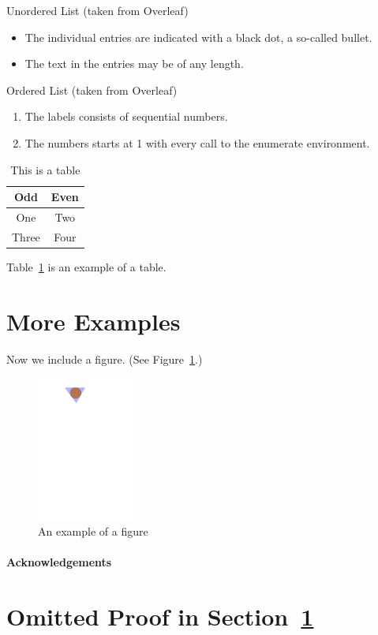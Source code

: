 \documentclass[a4paper]{article}
\theoremstyle{plain}
\theoremstyle{definition}
\begin{document}
Unordered List (taken from Overleaf)
\begin{itemize}
	\item The individual entries are indicated with a black dot, a so-called bullet.
	\item The text in the entries may be of any length.
\end{itemize}

Ordered List (taken from Overleaf)
\begin{enumerate}
	\item The labels consists of sequential numbers.
	\item The numbers starts at 1 with every call to the enumerate environment.
\end{enumerate}

\begin{table}[ht]
	\centering
	\begin{tabular}{|c|c|}
		\hline
		\textbf{Odd} & \textbf{Even} \\
		\hline\hline
		One          & Two           \\
		\hline
		Three        & Four          \\
		\hline
	\end{tabular}
	\caption{This is a table}
	\label{tbl:1}
\end{table}

Table~\ref*{tbl:1} is an example of a table.

\section{More Examples}
\label{sec:examples}

Now we include a figure.
(See Figure~\ref{fig:example}.)
\begin{figure}[ht]
	\centering
	\includegraphics[width=0.3\textwidth]{example}
	\caption{An example of a figure}
	\label{fig:example}
\end{figure}

\paragraph{Acknowledgements} \lipsum[6]


\nocite{*}

\appendix

\section{Omitted Proof in Section~\ref{sec:examples}}
\label{app:1}

\lipsum[7]
\end{document}
